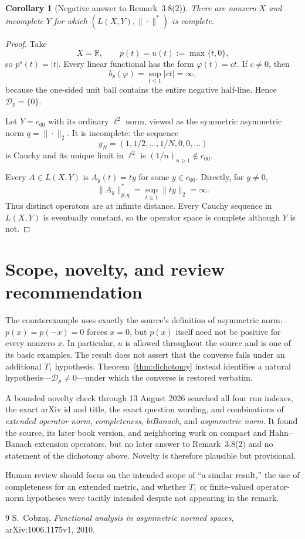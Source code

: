 \documentclass[11pt,a4paper]{article}
\newtheorem{corollary}{Corollary}
\newcommand{\R}{\mathbb R}
\newcommand{\D}{\mathcal D}
\begin{document}
\begin{corollary}[Negative answer to Remark~3.8(2)]\label{cor:counterexample}
There are nonzero $X$ and incomplete $Y$ for which $(L(X,Y),\|\cdot\|^*)$ is complete.
\end{corollary}

\begin{proof}
Take
\[
 X=\R,\qquad p(t)=u(t):=\max\{t,0\},
\]
so $p^s(t)=|t|$.  Every linear functional has the form $\varphi(t)=ct$.  If $c\neq0$, then
\[
 b_p(\varphi)=\sup_{t\leq1}|ct|=\infty,
\]
because the one-sided unit ball contains the entire negative half-line.  Hence $\D_p=\{0\}$.

Let $Y=c_{00}$ with its ordinary $\ell^2$ norm, viewed as the symmetric asymmetric norm $q=\|\cdot\|_2$.  It is incomplete: the sequence
\[
 y_N=(1,1/2,\ldots,1/N,0,0,\ldots)
\]
is Cauchy and its unique limit in $\ell^2$ is $(1/n)_{n\geq1}\notin c_{00}$.

Every $A\in L(X,Y)$ is $A_y(t)=ty$ for some $y\in c_{00}$.  Directly, for $y\neq0$,
\[
 \|A_y\|^*_{p,q}
 =\sup_{t\leq1}\|ty\|_2=\infty.
\]
Thus distinct operators are at infinite distance.  Every Cauchy sequence in $L(X,Y)$ is eventually constant, so the operator space is complete although $Y$ is not.
\end{proof}

\section{Scope, novelty, and review recommendation}

The counterexample uses exactly the source's definition of asymmetric norm: $p(x)=p(-x)=0$ forces $x=0$, but $p(x)$ itself need not be positive for every nonzero $x$.  In particular, $u$ is allowed throughout the source and is one of its basic examples.  The result does not assert that the converse fails under an additional $T_1$ hypothesis.  Theorem~\ref{thm:dichotomy} instead identifies a natural hypothesis---$\D_p\neq0$---under which the converse is restored verbatim.

A bounded novelty check through 13 August 2026 searched all four run indexes, the exact arXiv id and title, the exact question wording, and combinations of \emph{extended operator norm}, \emph{completeness}, \emph{biBanach}, and \emph{asymmetric norm}.  It found the source, its later book version, and neighboring work on compact and Hahn--Banach extension operators, but no later answer to Remark~3.8(2) and no statement of the dichotomy above.  Novelty is therefore plausible but provisional.

Human review should focus on the intended scope of ``a similar result,'' the use of completeness for an extended metric, and whether $T_1$ or finite-valued operator-norm hypotheses were tacitly intended despite not appearing in the remark.

\begin{thebibliography}{9}
S.~Cobza\c{s},
\emph{Functional analysis in asymmetric normed spaces},
arXiv:1006.1175v1, 2010.
\end{thebibliography}
\end{document}
